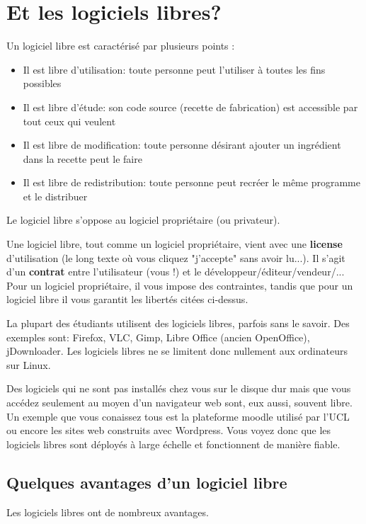 \documentclass[11pt]{../fiche}
\begin{document}
\section*{Et les logiciels libres?}

Un logiciel libre est caractérisé par plusieurs points :
\begin{itemize}
\item Il est libre d'utilisation: toute personne peut l'utiliser à toutes les fins possibles
\item Il est libre d'étude: son code source (recette de fabrication) est accessible par tout ceux qui veulent
\item Il est libre de modification: toute personne désirant ajouter un ingrédient dans la recette peut le faire
\item Il est libre de redistribution: toute personne peut recréer le même programme et le distribuer
\end{itemize}
Le logiciel libre s'oppose au logiciel propriétaire (ou privateur).

Une logiciel libre, tout comme un logiciel propriétaire, vient avec une
\textbf{license} d'utilisation (le long texte o\`u vous cliquez "j'accepte" sans
avoir lu...). Il s'agit d'un \textbf{contrat} entre l'utilisateur (vous !) et
le développeur/éditeur/vendeur/... Pour un logiciel propriétaire, il vous
impose des contraintes, tandis que pour un logiciel libre il vous garantit les
libertés citées ci-dessus.

La plupart des étudiants utilisent des logiciels libres, parfois sans le savoir.
Des exemples sont: Firefox, VLC, Gimp, Libre Office (ancien OpenOffice), jDownloader.
Les logiciels libres ne se limitent donc nullement aux ordinateurs sur Linux.

Des logiciels qui ne sont pas installés chez vous sur le disque dur mais
que vous accédez seulement au moyen d'un navigateur web sont, eux aussi, souvent libre.
Un exemple que vous conaissez tous est la plateforme moodle utilisé par l'UCL
ou encore les sites web construits avec Wordpress. Vous voyez donc que les logiciels
libres sont déployés à large échelle et fonctionnent de manière fiable.

\subsection*{Quelques avantages d'un logiciel libre}

Les logiciels libres ont de nombreux avantages.
\end{document}
